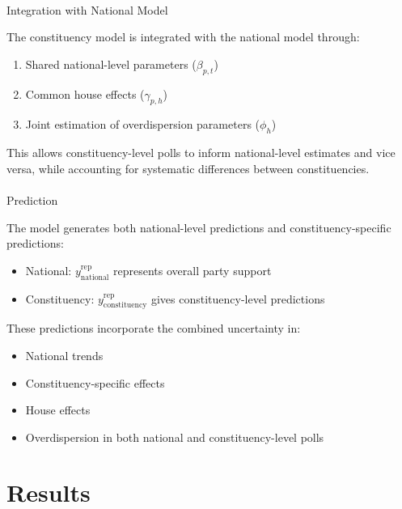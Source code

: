\documentclass[
  letterpaper,
  DIV=11,
  numbers=noendperiod]{scrartcl}
\makeatletter
\let\oldparagraph\paragraph
\renewcommand{\paragraph}{
    \@ifstar
      \xxxParagraphStar
      \xxxParagraphNoStar
  }
\newcommand{\xxxParagraphStar}[1]{\oldparagraph*{#1}\mbox{}}
\newcommand{\xxxParagraphNoStar}[1]{\oldparagraph{#1}\mbox{}}
\providecommand{\tightlist}{%
  \setlength{\itemsep}{0pt}\setlength{\parskip}{0pt}}\usepackage{longtable,booktabs,array}
\makeatother
\begin{document}
\paragraph{Integration with National
Model}\label{integration-with-national-model}

The constituency model is integrated with the national model through:

\begin{enumerate}
\def\labelenumi{\arabic{enumi}.}
\tightlist
\item
  Shared national-level parameters (\(\beta_{p,t}\))
\item
  Common house effects (\(\gamma_{p,h}\))
\item
  Joint estimation of overdispersion parameters (\(\phi_h\))
\end{enumerate}

This allows constituency-level polls to inform national-level estimates
and vice versa, while accounting for systematic differences between
constituencies.

\paragraph{Prediction}\label{prediction}

The model generates both national-level predictions and
constituency-specific predictions:

\begin{itemize}
\tightlist
\item
  National: \(y^{\text{rep}}_{\text{national}}\) represents overall
  party support
\item
  Constituency: \(y^{\text{rep}}_{\text{constituency}}\) gives
  constituency-level predictions
\end{itemize}

These predictions incorporate the combined uncertainty in:

\begin{itemize}
\tightlist
\item
  National trends
\item
  Constituency-specific effects
\item
  House effects
\item
  Overdispersion in both national and constituency-level polls
\end{itemize}

\section{Results}\label{results}
\end{document}
